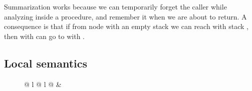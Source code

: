 \documentclass{LMCS}
\theoremstyle{definition} \newtheorem{property}[thm]{Property}
\begin{document}
Summarization works because we can temporarily forget the caller while
analyzing inside a procedure, and remember it when we are about to return.
A consequence is that if from node  with an empty stack we can reach  
with stack , then  with  can go to  with .


\subsection{Local semantics\label{subsec:localsems}}

\begin{figure}[!t]
  {\small
    \begin{tabular}{@{} l @{} l @{}}
      &
\end{tabular}}
\end{figure}
\end{document}
